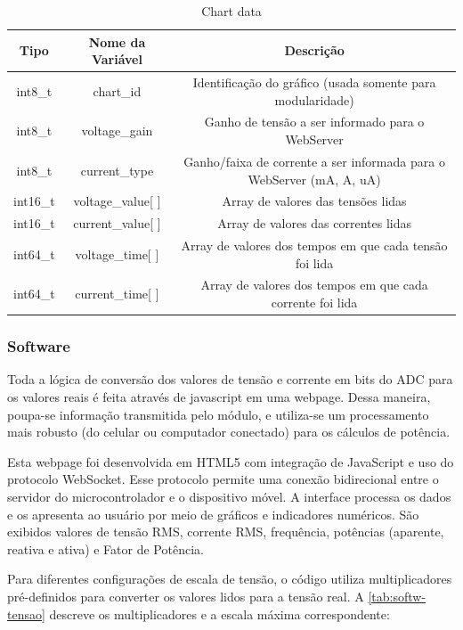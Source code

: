 \begin{table}[h!]
\centering
\caption{Chart data}
\begin{tabular}{|c|c|c|}
    \hline
    \textbf{Tipo} & \textbf{Nome da Variável} & \textbf{Descrição} \\ \hline
    int8\_t & chart\_id & Identificação do gráfico (usada somente para modularidade) \\ \hline
    int8\_t & voltage\_gain & Ganho de tensão a ser informado para o WebServer \\ \hline
    int8\_t & current\_type & Ganho/faixa de corrente a ser informada para o WebServer (mA, A, uA) \\ \hline
    int16\_t & voltage\_value[ ] & Array de valores das tensões lidas \\ \hline
    int16\_t & current\_value[ ] & Array de valores das correntes lidas \\ \hline
    int64\_t & voltage\_time[ ] & Array de valores dos tempos em que cada tensão foi lida \\ \hline
    int64\_t & current\_time[ ] & Array de valores dos tempos em que cada corrente foi lida \\ \hline
\end{tabular}
\label{tab:struct-graph}
\fonte{}
\end{table}

\subsubsection{Software}\label{softwa}

Toda a lógica de conversão dos valores de tensão e corrente em bits do \gls{ADC} para os valores reais é feita através de javascript em uma webpage. Dessa maneira, poupa-se informação transmitida pelo módulo, e utiliza-se um processamento mais robusto (do celular ou computador conectado) para os cálculos de potência.

Esta webpage foi desenvolvida em HTML5 com integração de JavaScript e uso do protocolo WebSocket. Esse protocolo permite uma conexão bidirecional entre o servidor do microcontrolador e o dispositivo móvel. A interface processa os dados e os apresenta ao usuário por meio de gráficos e indicadores numéricos. São exibidos valores de tensão RMS, corrente RMS, frequência, potências (aparente, reativa e ativa) e Fator de Potência.

Para diferentes configurações de escala de tensão, o código utiliza multiplicadores pré-definidos para converter os valores lidos para a tensão real. A \autoref{tab:softw-tensao} descreve os multiplicadores e a escala máxima correspondente:

